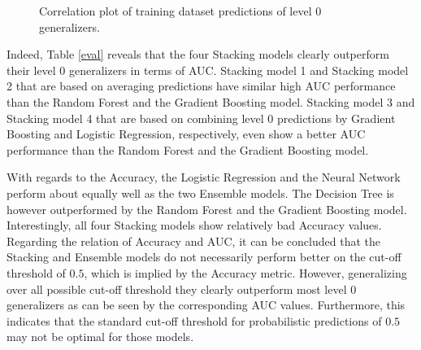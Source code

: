 \documentclass[12pt]{article}
\begin{document}
\begin{figure}[htp] 
\caption{Correlation plot of training dataset predictions of level 0 generalizers.}\label{corrgram}
\end{figure}  

Indeed, Table \ref{eval} reveals that the four Stacking models clearly outperform their level 0 generalizers in terms of AUC. Stacking model 1 and Stacking model 2 that are based on averaging predictions have similar high AUC performance than the Random Forest and the Gradient Boosting model. Stacking model 3 and Stacking model 4 that are based on combining level 0 predictions by Gradient Boosting and Logistic Regression, respectively, even show a better AUC performance than the Random Forest and the Gradient Boosting model. 

With regards to the Accuracy, the Logistic Regression and the Neural Network perform about equally well as the two Ensemble models. The Decision Tree is however outperformed by the Random Forest and the Gradient Boosting model. Interestingly, all four Stacking models show relatively bad Accuracy values. Regarding the relation of Accuracy and AUC, it can be concluded that the Stacking and Ensemble models do not necessarily perform better on the cut-off threshold of $0.5$, which is implied by the Accuracy metric. However, generalizing over all possible cut-off threshold they clearly outperform most level 0 generalizers as can be seen by the corresponding AUC values. Furthermore, this indicates that the standard cut-off threshold for probabilistic predictions of $0.5$ may not be optimal for those models.
\end{document}

